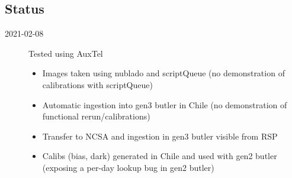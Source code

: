 \subsection{Status}

\begin{description}
   \item[2021-02-08]
        Tested using AuxTel
        \begin{itemize}
                \item Images taken using nublado and \gls{scriptQueue}
                  (no demonstration of calibrations with \gls{scriptQueue})
                \item Automatic ingestion into gen3 butler in Chile
                  (no demonstration of functional rerun/calibrations)
                \item Transfer to NCSA and ingestion in gen3 butler visible from \gls{RSP}
                \item Calibs (bias, dark) generated in Chile and used with gen2 butler
                  (exposing a per-day lookup bug in gen2 butler)
        \end{itemize}
   \end{description}
        
